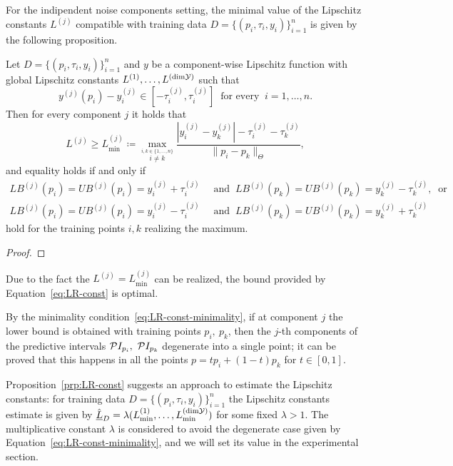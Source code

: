 For the indipendent noise components setting, the minimal value of the Lipschitz constants $L^{(j)}$ compatible with training data $D=\{ (p_i, \tau_i, y_i) \}_{i=1}^n$ is given by the following proposition.
\begin{prp} \label{prp:LR-const}
    Let $D=\{ (p_i, \tau_i, y_i) \}_{i=1}^n$ and $y$ be a component-wise Lipschitz function with global Lipschitz constants $L^{(1)},\dots, L^{(\text{dim}\mathcal Y)}$ such that 
    \[
        y^{(j)}(p_i) -y_i^{(j)} \in  [-\tau_i^{(j)},\tau_i^{(j)}] \ \text{ for every } \ i = 1, \dots, n.
    \]
    Then for every component $j$ it holds that
    \begin{equation}\label{eq:LR-const}
        L^{(j)} \geq L^{(j)}_{\min}\coloneq \max_{ \stackrel{i, k \in \{1, \dots, n\}}{i\neq k} } \frac{| y_i^{(j)} - y_k^{(j)} | - \tau_i^{(j)} - \tau_k^{(j)}}{\| p_i - p_k \|_\Theta},
    \end{equation}
    and equality holds if and only if
    \begin{equation}\label{eq:LR-const-minimality}
        \begin{aligned}
            LB^{(j)}(p_i) =UB^{(j)}(p_i) = y_i^{(j)} + \tau_i^{(j)}  \ &\text{ and }   \ LB^{(j)}(p_k) =UB^{(j)}(p_k) = y_k^{(j)} - \tau_k^{(j)}, \ \text{ or } \\
            LB^{(j)}(p_i) =UB^{(j)}(p_i) = y_i^{(j)} - \tau_i^{(j)}  \ &\text{ and }   \ LB^{(j)}(p_k) =UB^{(j)}(p_k) = y_k^{(j)} + \tau_k^{(j)}
        \end{aligned}
    \end{equation}
    hold for the training points $i,k$ realizing the maximum. 
\end{prp}
\begin{proof}
    
\end{proof}
\begin{rmk}
Due to the fact the $L^{(j)}=L^{(j)}_{\min}$ can be realized, the bound provided by Equation~\eqref{eq:LR-const} is optimal. 
\end{rmk}
\begin{rmk}
By the minimality condition~\eqref{eq:LR-const-minimality}, if at component $j$ the lower bound is obtained with training points $p_i, \ p_k$, then the $j$-th components of the predictive intervals $\mathcal PI_{p_i},\ \mathcal PI_{p_k}$ degenerate into a single point; it can be proved that this happens in all the points $p = t p_i + (1-t) p_k$ for $t \in [0,1]$. 
\end{rmk}

Proposition~\ref{prp:LR-const} suggests an approach to estimate the Lipschitz constants: for training data $D=\{ (p_i, \tau_i, y_i) \}_{i=1}^n$ the Lipschitz constants estimate is given by $\hat{\underline{L}}_D = \lambda ( L^{(1)}_{\min}, \dots, L^{(\text{dim}\mathcal Y)}_{\min})$ for some fixed $\lambda > 1$. 
The multiplicative constant $\lambda$ is considered to avoid the degenerate case given by Equation~\eqref{eq:LR-const-minimality}, and we will set its value in the experimental section.